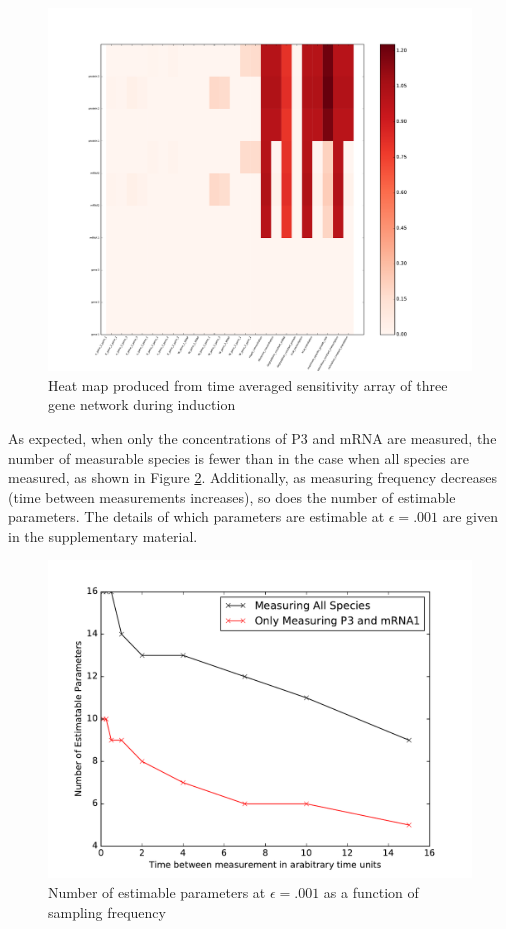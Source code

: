 \documentclass{article}
\begin{document}
\begin{figure}[!htb]
\includegraphics[width=12cm]{../ThreeGeneRachelV2/figures/ParameterSpeciesInteractionsFrom10to70}
\caption{Heat map produced from time averaged sensitivity array of three gene network during induction}
\label{fig:P2Induced}
\end{figure}

As expected, when only the concentrations of P3 and mRNA are measured, the number of measurable species is fewer than in the case when all species are measured, as shown in Figure \ref{fig:P2Freq}. Additionally, as measuring frequency decreases (time between measurements increases), so does the number of estimable parameters. The details of which parameters are estimable at $\epsilon = .001$ are given in the  supplementary material.
\begin{figure}[!htb]
\includegraphics[width=12cm]{../ThreeGeneRachelV2/figures/NumberOfEstamatableParamsAsAFunctionOfFreq}
\caption{Number of estimable parameters at $\epsilon =.001$ as a function of sampling frequency}
\label{fig:P2Freq}
\end{figure}
\newpage
\end{document}
